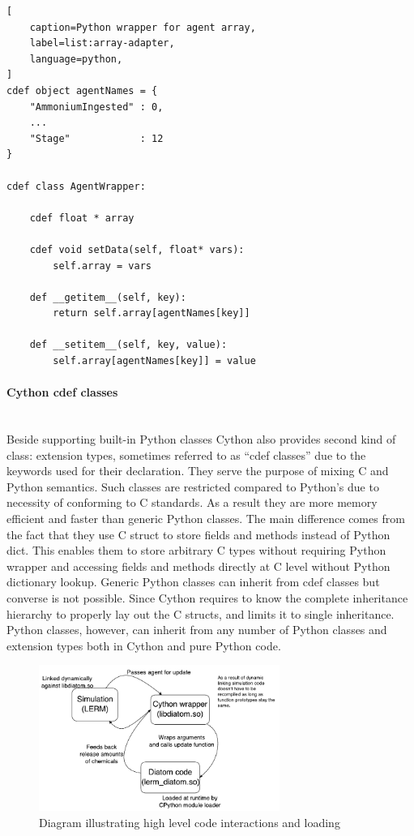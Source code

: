 \documentclass[12pt, a4paper]{report}
\newcommand{\myparagraph}[1]{\paragraph{#1}\mbox{}\\}
\begin{document}
\begin{lstlisting}[
    caption=Python wrapper for agent array,
    label=list:array-adapter,
    language=python,
]
cdef object agentNames = {
    "AmmoniumIngested" : 0,
    ...
    "Stage"            : 12
}

cdef class AgentWrapper:

    cdef float * array

    cdef void setData(self, float* vars):
        self.array = vars

    def __getitem__(self, key):
        return self.array[agentNames[key]]

    def __setitem__(self, key, value):
        self.array[agentNames[key]] = value
\end{lstlisting}

\myparagraph{Cython cdef classes}\label{para:cython-cdef}
Beside supporting built-in Python classes Cython also provides second kind of
class: extension types, sometimes referred to as “cdef classes” due to the
keywords used for their declaration. They serve the purpose of mixing C and
Python semantics. Such classes are restricted compared to Python's due to
necessity of conforming to C standards. As a result they are more
memory efficient and faster than generic Python classes. The main difference
comes from the fact that they use C struct to store fields and methods instead
of Python dict. This enables them to store arbitrary C types without requiring
Python wrapper and accessing fields and methods directly at C level without
Python dictionary lookup. Generic Python classes can inherit from cdef classes
but converse is not possible. Since Cython requires to know the complete inheritance
hierarchy to properly lay out the C structs, and limits it to single inheritance.
Python classes, however, can inherit from any number of Python classes and
extension types both in Cython and pure Python code.
\\

\begin{figure}[H]
  \begin{center}
    \includegraphics[width=0.7\textwidth,natwidth=731,natheight=441]{images/embed-diagram.pdf}
    \caption{Diagram illustrating high level code interactions and loading}
    \label{fig:embed-diagram}
  \end{center}
\end{figure}
\end{document}

